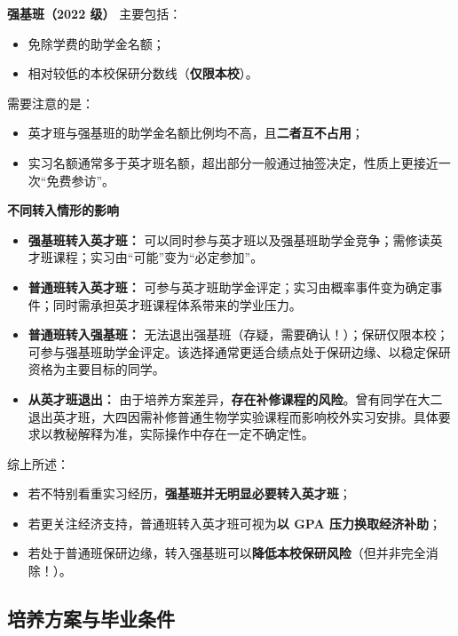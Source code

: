\textbf{强基班（2022 级）}
主要包括：
\begin{itemize}
  \item 免除学费的助学金名额；
  \item 相对较低的本校保研分数线（\textbf{仅限本校}）。
\end{itemize}

需要注意的是：
\begin{itemize}
  \item 英才班与强基班的助学金名额比例均不高，且\textbf{二者互不占用}；
  \item 实习名额通常多于英才班名额，超出部分一般通过抽签决定，性质上更接近一次“免费参访”。
\end{itemize}

\textbf{不同转入情形的影响}

\begin{itemize}
  \item \textbf{强基班转入英才班：}  
  可以同时参与英才班以及强基班助学金竞争；需修读英才班课程；实习由“可能”变为“必定参加”。
  
  \item \textbf{普通班转入英才班：}  
  可参与英才班助学金评定；实习由概率事件变为确定事件；同时需承担英才班课程体系带来的学业压力。
  
  \item \textbf{普通班转入强基班：}  
  无法退出强基班（存疑，需要确认！）；保研仅限本校；可参与强基班助学金评定。该选择通常更适合绩点处于保研边缘、以稳定保研资格为主要目标的同学。
  
  \item \textbf{从英才班退出：}  
  由于培养方案差异，\textbf{存在补修课程的风险}。曾有同学在大二退出英才班，大四因需补修普通生物学实验课程而影响校外实习安排。具体要求以教秘解释为准，实际操作中存在一定不确定性。
\end{itemize}

综上所述：
\begin{itemize}
  \item 若不特别看重实习经历，\textbf{强基班并无明显必要转入英才班}；
  \item 若更关注经济支持，普通班转入英才班可视为\textbf{以 GPA 压力换取经济补助}；
  \item 若处于普通班保研边缘，转入强基班可以\textbf{降低本校保研风险}（但并非完全消除！）。
\end{itemize}

\subsection{培养方案与毕业条件}

